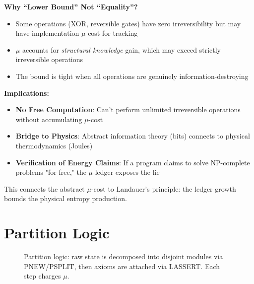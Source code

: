 \textbf{Why ``Lower Bound'' Not ``Equality''?}
\begin{itemize}
    \item Some operations (XOR, reversible gates) have zero irreversibility but may have implementation $\mu$-cost for tracking
    \item $\mu$ accounts for \emph{structural knowledge} gain, which may exceed strictly irreversible operations
    \item The bound is tight when all operations are genuinely information-destroying
\end{itemize}

\textbf{Implications:}
\begin{itemize}
    \item \textbf{No Free Computation}: Can't perform unlimited irreversible operations without accumulating $\mu$-cost
    \item \textbf{Bridge to Physics}: Abstract information theory (bits) connects to physical thermodynamics (Joules)
    \item \textbf{Verification of Energy Claims}: If a program claims to solve NP-complete problems "for free," the $\mu$-ledger exposes the lie
\end{itemize}

This connects the abstract $\mu$-cost to Landauer's principle: the ledger growth bounds the physical entropy production.

\section{Partition Logic}

\begin{figure}[H]
\centering
{}
\caption{Partition logic: raw state is decomposed into disjoint modules via PNEW/PSPLIT, then axioms are attached via LASSERT. Each step charges $\mu$.}
\label{fig:partition-logic}
\end{figure}

